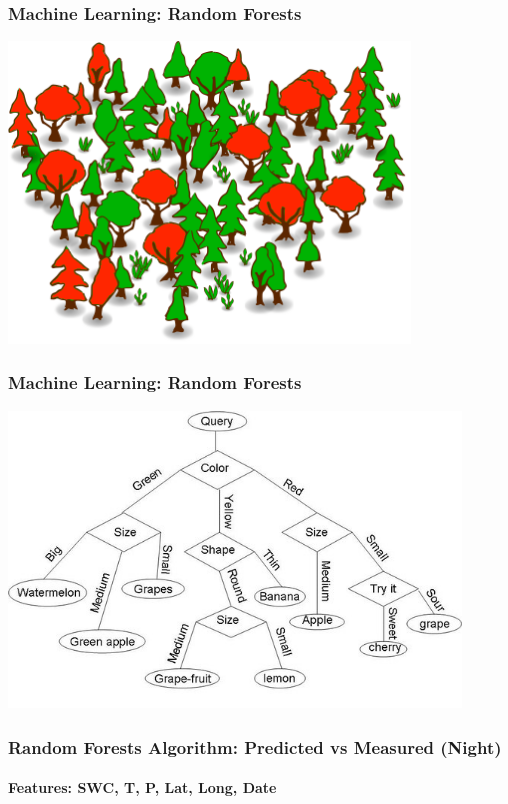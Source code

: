 \documentclass{beamer}
\begin{document}
\begin{frame}
\frametitle{Machine Learning: Random Forests\footnotemark}
\centering
\includegraphics[width=0.8\textwidth]{random_forest.png}\\
\end{frame}


\begin{frame}
\frametitle{Machine Learning: Random Forests}
\centering
\includegraphics[width=0.9\textwidth]{rf.jpeg}\\
\end{frame}


\begin{frame}
\frametitle{Random Forests Algorithm: Predicted vs Measured (Night)}
\framesubtitle{Features: SWC, T, P, Lat, Long, Date}
\end{frame}
\end{document}
